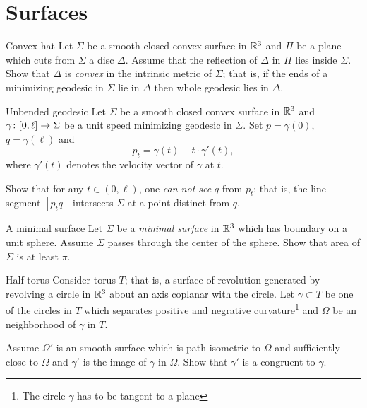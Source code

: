 \documentclass[twoside]{book}
\begin{document}
\chapter{Surfaces}



\begin{pr}{\easy}{Convex hat}\label{Convex hat}
Let $\Sigma$ be a smooth closed convex surface 
in $\mathbb{R}^3$ 
and $\Pi$ be a plane which cuts from $\Sigma$ a disc $\Delta$.
Assume that the reflection of $\Delta$ in $\Pi$ lies inside $\Sigma$.
Show that $\Delta$ is \emph{convex} in the intrinsic metric  of $\Sigma$;
that is, 
if the ends of a minimizing geodesic in $\Sigma$ 
lie in $\Delta$ then whole geodesic lies in $\Delta$.
\end{pr}

\begin{pr}{}{Unbended geodesic}\label{Unbended geodesic} %
Let $\Sigma$ be a smooth closed convex surface 
in $\mathbb{R}^3$ 
and $\gamma\:[0,\ell]\z\to \Sigma$ be a unit speed minimizing geodesic in $\Sigma$.
Set $p=\gamma(0)$, $q=\gamma(\ell)$ and 
$$p_t=\gamma(t)-t\cdot\gamma'(t),$$ 
where $\gamma'(t)$ denotes the velocity vector of $\gamma$ at $t$.

Show that for any $t\in (0,\ell)$,
one \emph{can not see}  $q$ from $p_t$;
that is, the line segment $[p_tq]$ intersects $\Sigma$ at a point distinct from $q$.
\end{pr}


\begin{pr}{}{A minimal surface}%
\label{min-surf}
Let $\Sigma$ be a \hyperref[Minimal surface]{\emph{minimal surface}} in $\mathbb{R}^3$ which has boundary on a unit sphere.
Assume $\Sigma$ passes through the center of the sphere.
Show that area of $\Sigma$ is at least $\pi$.
\end{pr}

\begin{pr}{\hard}{Half-torus}\label{half-torus}
Consider torus $T$;
that is, a surface of revolution generated by revolving a circle in $\mathbb{R}^3$ about an axis coplanar with the circle.
Let $\gamma\subset T$ be one of the circles in $T$ which separates positive and negrative curvature\footnote{The circle $\gamma$ has to be tangent to a plane}
and $\Omega$ be an neighborhood of $\gamma$ in $T$.


Assume $\Omega'$ is an smooth surface which is path isometric to $\Omega$ and sufficiently close to $\Omega$
and $\gamma'$ is the image of $\gamma$ in $\Omega$.
Show that $\gamma'$ is a congruent to $\gamma$.
\end{pr}
\end{document}
